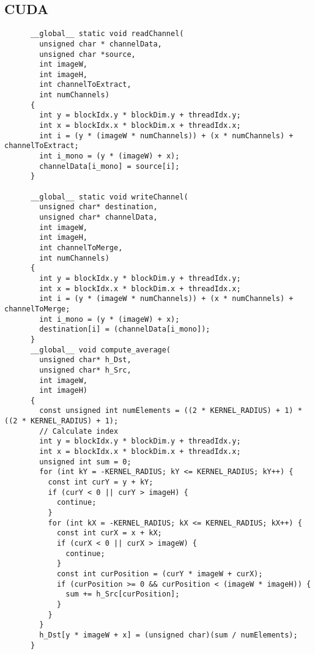 \documentclass[8pt,a4paper]{article}
\begin{document}
\begin{multicols}{5}
    \subsection{CUDA}
    \begin{verbatim}
      __global__ static void readChannel(
        unsigned char * channelData,
        unsigned char *source,
        int imageW,
        int imageH,
        int channelToExtract,
        int numChannels)
      {
        int y = blockIdx.y * blockDim.y + threadIdx.y;
        int x = blockIdx.x * blockDim.x + threadIdx.x;
        int i = (y * (imageW * numChannels)) + (x * numChannels) + channelToExtract;
        int i_mono = (y * (imageW) + x);
        channelData[i_mono] = source[i];
      }

      __global__ static void writeChannel(
        unsigned char* destination,
        unsigned char* channelData,
        int imageW,
        int imageH,
        int channelToMerge,
        int numChannels)
      {
        int y = blockIdx.y * blockDim.y + threadIdx.y;
        int x = blockIdx.x * blockDim.x + threadIdx.x;
        int i = (y * (imageW * numChannels)) + (x * numChannels) + channelToMerge;
        int i_mono = (y * (imageW) + x);
        destination[i] = (channelData[i_mono]);
      }
      __global__ void compute_average(
        unsigned char* h_Dst,
        unsigned char* h_Src,
        int imageW,
        int imageH)
      {
        const unsigned int numElements = ((2 * KERNEL_RADIUS) + 1) * ((2 * KERNEL_RADIUS) + 1);
        // Calculate index
        int y = blockIdx.y * blockDim.y + threadIdx.y;
        int x = blockIdx.x * blockDim.x + threadIdx.x;
        unsigned int sum = 0;
        for (int kY = -KERNEL_RADIUS; kY <= KERNEL_RADIUS; kY++) {
          const int curY = y + kY;
          if (curY < 0 || curY > imageH) {
            continue;
          }
          for (int kX = -KERNEL_RADIUS; kX <= KERNEL_RADIUS; kX++) {
            const int curX = x + kX;
            if (curX < 0 || curX > imageW) {
              continue;
            }
            const int curPosition = (curY * imageW + curX);
            if (curPosition >= 0 && curPosition < (imageW * imageH)) {
              sum += h_Src[curPosition];
            }
          }
        }
        h_Dst[y * imageW + x] = (unsigned char)(sum / numElements);
      }


\end{verbatim}
\end{multicols}
\end{document}
